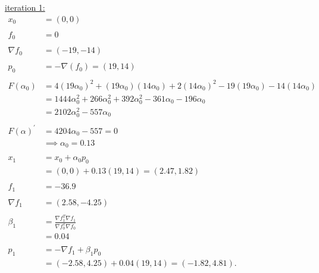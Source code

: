 \documentclass{article}
\begin{document}
\noindent
\underline{iteration 1:}
\begin{align*}
  x_0 &= (0, 0) &&\\
  &&\\
  f_0 &= 0 &&\\
  &&\\
  \nabla f_0 &= (-19, -14) &&\\
  &&\\
  p_0 &= -\nabla(f_0) = (19, 14) &&\\
  &&\\
  F(\alpha_0) 
  &= 4(19 \alpha_0)^2  + (19 \alpha_0)(14 \alpha_0) + 2(14 \alpha_0)^2 - 19(19 \alpha_0) - 14(14 \alpha_0) &&\\
  &= 1444 \alpha_0^2 + 266 \alpha_0^2 + 392 \alpha_0^2 - 361 \alpha_0 - 196 \alpha_0 &&\\
  &= 2102 \alpha_0^2 -557 \alpha_0 &&\\
  &&\\
  F(\alpha)^\prime &= 4204 \alpha_0 - 557 = 0 &&\\
  &\implies \alpha_0 = 0.13 &&\\
  &&\\
  x_{1} &= x_0 + \alpha_0 p_0 &&\\
  &= (0, 0) + 0.13 (19, 14) = (2.47, 1.82) &&\\
  &&\\
  f_1 &= -36.9 &&\\
  &&\\
  \nabla f_1 &=  (2.58, -4.25) &&\\
  &&\\
  \beta_{1} &= \frac{\nabla f_1^T \nabla f_1}{\nabla f_0^T \nabla f_0} &&\\
  &= 0.04 &&\\
  &&\\
  p_1 &= -\nabla f_1 + \beta_1 p_0 &&\\
  &= (-2.58, 4.25) + 0.04 (19, 14) = (-1.82, 4.81).
\end{align*}
\newline
\end{document}
